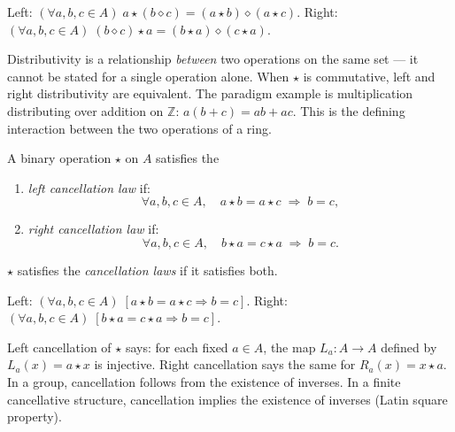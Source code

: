 \begin{remark}
Left: $(\forall a,b,c \in A)\;
a \star (b \diamond c) = (a \star b) \diamond (a \star c)$.
Right: $(\forall a,b,c \in A)\;
(b \diamond c) \star a = (b \star a) \diamond (c \star a)$.
\end{remark}

\begin{remark}
Distributivity is a relationship \emph{between} two operations on the same
set — it cannot be stated for a single operation alone.
When $\star$ is commutative, left and right distributivity are equivalent.
The paradigm example is multiplication distributing over addition on
$\mathbb{Z}$: $a(b + c) = ab + ac$.
This is the defining interaction between the two operations of a ring.
\end{remark}

\begin{tcolorbox}[colback=propbox, colframe=propborder, arc=2pt,
  left=6pt, right=6pt, top=4pt, bottom=4pt,
  title={\small\textbf{Definition (Cancellation Laws)}},
  fonttitle=\small\bfseries]
\label{def:cancellation}
A binary operation $\star$ on $A$ satisfies the
\begin{enumerate}[label=(\roman*)]
  \item \emph{left cancellation law} if:
        \[
          \forall a, b, c \in A,\quad
          a \star b = a \star c \;\Rightarrow\; b = c,
        \]
  \item \emph{right cancellation law} if:
        \[
          \forall a, b, c \in A,\quad
          b \star a = c \star a \;\Rightarrow\; b = c.
        \]
\end{enumerate}
$\star$ satisfies the \emph{cancellation laws} if it satisfies both.
\end{tcolorbox}

\begin{remark}
Left: $(\forall a,b,c \in A)\;[a \star b = a \star c \Rightarrow b = c]$.
Right: $(\forall a,b,c \in A)\;[b \star a = c \star a \Rightarrow b = c]$.
\end{remark}

\begin{remark}
Left cancellation of $\star$ says: for each fixed $a \in A$, the map
$L_a : A \to A$ defined by $L_a(x) = a \star x$ is injective.
Right cancellation says the same for $R_a(x) = x \star a$.
In a group, cancellation follows from the existence of inverses.
In a finite cancellative structure, cancellation implies the existence of
inverses (Latin square property).
\end{remark}

